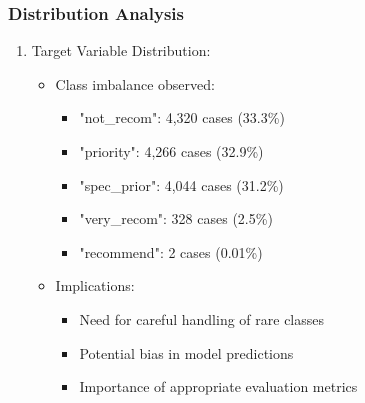 \subsubsection{Distribution Analysis}
\begin{enumerate}
    \item Target Variable Distribution:
    \begin{itemize}
        \item Class imbalance observed:
            \begin{itemize}
                \item "not\_recom": 4,320 cases (33.3\%)
                \item "priority": 4,266 cases (32.9\%)
                \item "spec\_prior": 4,044 cases (31.2\%)
                \item "very\_recom": 328 cases (2.5\%)
                \item "recommend": 2 cases (0.01\%)
            \end{itemize}
        \item Implications:
            \begin{itemize}
                \item Need for careful handling of rare classes
                \item Potential bias in model predictions
                \item Importance of appropriate evaluation metrics
            \end{itemize}
    \end{itemize}
    

\end{enumerate}
